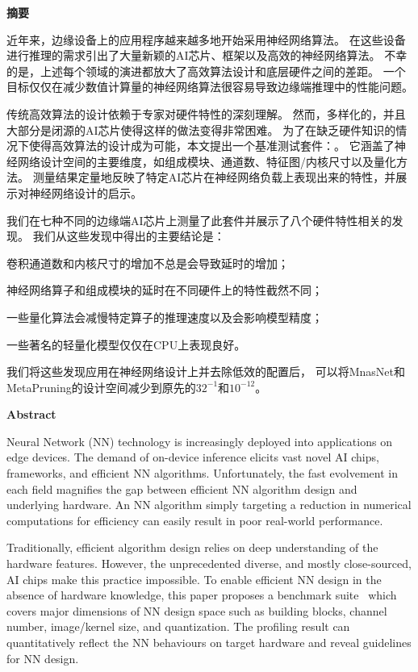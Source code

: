\cleardoublepage{}
\begin{center}
    \bfseries {} 摘要
\end{center}
近年来，边缘设备上的应用程序越来越多地开始采用神经网络算法。
在这些设备进行推理的需求引出了大量新颖的AI芯片、框架以及高效的神经网络算法。
不幸的是，上述每个领域的演进都放大了高效算法设计和底层硬件之间的差距。
一个目标仅仅在减少数值计算量的神经网络算法很容易导致边缘端推理中的性能问题。

传统高效算法的设计依赖于专家对硬件特性的深刻理解。
然而，多样化的，并且大部分是闭源的AI芯片使得这样的做法变得非常困难。
为了在缺乏硬件知识的情况下使得高效算法的设计成为可能，本文提出一个基准测试套件：\sysname。
它涵盖了神经网络设计空间的主要维度，如组成模块、通道数、特征图/内核尺寸以及量化方法。
测量结果定量地反映了特定AI芯片在神经网络负载上表现出来的特性，并展示对神经网络设计的启示。

我们在七种不同的边缘端AI芯片上测量了此套件并展示了八个硬件特性相关的发现。
我们从这些发现中得出的主要结论是：
\begin{enumerate*}
    \item 卷积通道数和内核尺寸的增加不总是会导致延时的增加；
    \item 神经网络算子和组成模块的延时在不同硬件上的特性截然不同；
    \item 一些量化算法会减慢特定算子的推理速度以及会影响模型精度；
    \item 一些著名的轻量化模型仅仅在CPU上表现良好。
\end{enumerate*}

我们将这些发现应用在神经网络设计上并去除低效的配置后，
可以将MnasNet和MetaPruning的设计空间减少到原先的$32^{-1}$和$10^{-12}$。

\cleardoublepage{}
\begin{center}
    \bfseries {} Abstract
\end{center}
Neural Network (NN) technology is increasingly deployed
into applications on edge devices. The demand of on-device
inference elicits vast novel AI chips, frameworks, and efficient NN algorithms.
Unfortunately, the fast evolvement in
each field magnifies the gap between efficient NN algorithm
design and underlying hardware. An NN algorithm simply
targeting a reduction in numerical computations for efficiency
can easily result in poor real-world performance.

Traditionally, efficient algorithm design relies on deep understanding of the hardware features. 
However, the unprecedented diverse, and mostly close-sourced, AI chips make
this practice impossible. To enable efficient NN design in
the absence of hardware knowledge, this paper proposes a
benchmark suite \sysname~which covers major dimensions
of NN design space such as building blocks, channel number,
image/kernel size, and quantization. The profiling result can
quantitatively reflect the NN behaviours on target
hardware and reveal guidelines for NN design.

